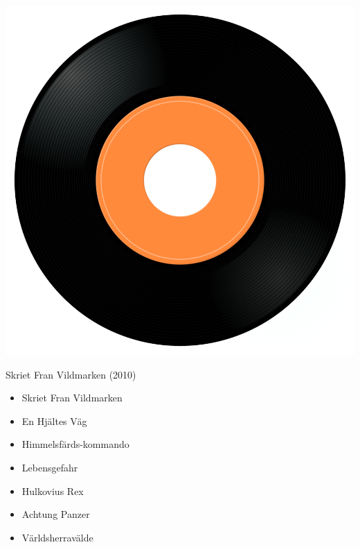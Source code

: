\begin{minipage}[t]{0.25\textwidth}
\captionsetup{type=figure}
\includegraphics[width=\textwidth]{Images/cover.png}
\caption*{Skriet Fran Vildmarken (2010)}
\end{minipage}
\begin{minipage}[t]{0.25\textwidth}\vspace{0pt}
\begin{itemize}[nosep,leftmargin=1em,labelwidth=*,align=left]
	\setlength{\itemsep}{0pt}
	\item Skriet Fran Vildmarken
	\item En Hjältes Väg
	\item Himmelsfärds-kommando
	\item Lebensgefahr
	\item Hulkovius Rex
	\item Achtung Panzer
	\item Världsherravälde
\end{itemize}
\end{minipage}
